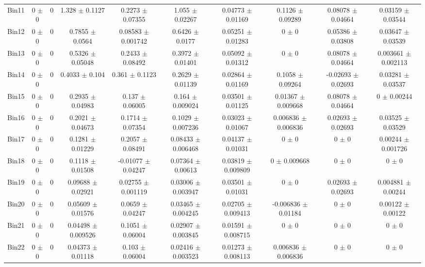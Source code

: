 \begin{tabular}{@{\extracolsep{4pt}}lccccccccc@{}}
     Bin11 & 0 $\pm$ 0 & 0 & 1.328 $\pm$ 0.1127 & 0.2273 $\pm$ 0.07355 & 1.055 $\pm$ 0.02267 & 0.04773 $\pm$ 0.01169 & 0.1126 $\pm$ 0.09289 & 0.08078 $\pm$ 0.04664 & 0.03159 $\pm$ 0.03544 \\ 
     Bin12 & 0 $\pm$ 0 & 0 & 0.7855 $\pm$ 0.0564 & 0.08583 $\pm$ 0.001742 & 0.6426 $\pm$ 0.0177 & 0.05251 $\pm$ 0.01283 & 0 $\pm$ 0 & 0.05386 $\pm$ 0.03808 & 0.03647 $\pm$ 0.03539 \\ 
     Bin13 & 0 $\pm$ 0 & 0 & 0.5326 $\pm$ 0.05048 & 0.2433 $\pm$ 0.08492 & 0.3972 $\pm$ 0.01401 & 0.05092 $\pm$ 0.01312 & 0 $\pm$ 0 & 0.08078 $\pm$ 0.04664 & 0.003661 $\pm$ 0.002113 \\ 
     Bin14 & 0 $\pm$ 0 & 0 & 0.4033 $\pm$ 0.104 & 0.361 $\pm$ 0.1123 & 0.2629 $\pm$ 0.01139 & 0.02864 $\pm$ 0.01169 & 0.1058 $\pm$ 0.09264 & -0.02693 $\pm$ 0.02693 & 0.03281 $\pm$ 0.03537 \\ 
     Bin15 & 0 $\pm$ 0 & 0 & 0.2935 $\pm$ 0.04983 & 0.137 $\pm$ 0.06005 & 0.164 $\pm$ 0.009024 & 0.03501 $\pm$ 0.01125 & 0.01367 $\pm$ 0.009668 & 0.08078 $\pm$ 0.04664 & 0 $\pm$ 0.00244 \\ 
     Bin16 & 0 $\pm$ 0 & 0 & 0.2021 $\pm$ 0.04673 & 0.1714 $\pm$ 0.07354 & 0.1029 $\pm$ 0.007236 & 0.03023 $\pm$ 0.01067 & 0.006836 $\pm$ 0.006836 & 0.02693 $\pm$ 0.02693 & 0.03525 $\pm$ 0.03529 \\ 
     Bin17 & 0 $\pm$ 0 & 0 & 0.1281 $\pm$ 0.01229 & 0.2057 $\pm$ 0.08491 & 0.08433 $\pm$ 0.006468 & 0.04137 $\pm$ 0.01031 & 0 $\pm$ 0 & 0 $\pm$ 0 & 0.00244 $\pm$ 0.001726 \\ 
     Bin18 & 0 $\pm$ 0 & 0 & 0.1118 $\pm$ 0.01508 & -0.01077 $\pm$ 0.04247 & 0.07364 $\pm$ 0.00613 & 0.03819 $\pm$ 0.009809 & 0 $\pm$ 0.009668 & 0 $\pm$ 0 & 0 $\pm$ 0 \\ 
     Bin19 & 0 $\pm$ 0 & 0 & 0.09688 $\pm$ 0.02921 & 0.02755 $\pm$ 0.001119 & 0.03006 $\pm$ 0.003947 & 0.03501 $\pm$ 0.01031 & 0 $\pm$ 0 & 0.02693 $\pm$ 0.02693 & 0.004881 $\pm$ 0.00244 \\ 
     Bin20 & 0 $\pm$ 0 & 0 & 0.05609 $\pm$ 0.01576 & 0.0659 $\pm$ 0.04247 & 0.03465 $\pm$ 0.004245 & 0.02705 $\pm$ 0.009413 & -0.006836 $\pm$ 0.01184 & 0 $\pm$ 0 & 0.00122 $\pm$ 0.00122 \\ 
     Bin21 & 0 $\pm$ 0 & 0 & 0.04498 $\pm$ 0.009526 & 0.1051 $\pm$ 0.06004 & 0.02907 $\pm$ 0.003845 & 0.01591 $\pm$ 0.008715 & 0 $\pm$ 0 & 0 $\pm$ 0 & 0 $\pm$ 0 \\ 
     Bin22 & 0 $\pm$ 0 & 0 & 0.04373 $\pm$ 0.01118 & 0.103 $\pm$ 0.06004 & 0.02416 $\pm$ 0.003523 & 0.01273 $\pm$ 0.008113 & 0.006836 $\pm$ 0.006836 & 0 $\pm$ 0 & 0 $\pm$ 0 \\ 

\end{tabular}
